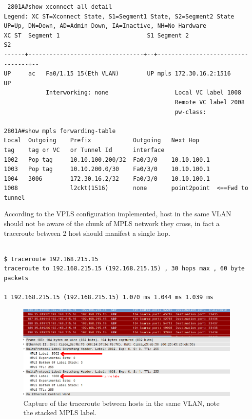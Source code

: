 \documentclass{llncs}
\begin{document}
\lstset{language=sh, caption=Cisco 2801A (LER) configuration after VPLS set-up, basicstyle=\ttfamily\scriptsize , breaklines=true}
\begin{lstlisting}
 2801A#show xconnect all detail 
Legend: XC ST=Xconnect State, S1=Segment1 State, S2=Segment2 State
UP=Up, DN=Down, AD=Admin Down, IA=Inactive, NH=No Hardware
XC ST  Segment 1                         S1 Segment 2                         S2
------+---------------------------------+--+---------------------------------+--
UP     ac   Fa0/1.15 15(Eth VLAN)        UP mpls 172.30.16.2:1516             UP
            Interworking: none                   Local VC label 1008            
                                                 Remote VC label 2008           
                                                 pw-class:          
                                                             
2801A#show mpls forwarding-table 
Local  Outgoing    Prefix            Outgoing   Next Hop    
tag    tag or VC   or Tunnel Id      interface              
1002   Pop tag     10.10.100.200/32  Fa0/3/0    10.10.100.1  
1003   Pop tag     10.10.200.0/30    Fa0/3/0    10.10.100.1  
1004   3006        172.30.16.2/32    Fa0/3/0    10.10.100.1  
1008               l2ckt(1516)       none       point2point  <==Fwd to tunnel
\end{lstlisting}

According to the VPLS configuration implemented, host in the same VLAN should not be aware of the chunk of MPLS network they cross, in fact a traceroute between 2 host should manifest a single hop.\\

\lstset{language=sh, caption=Traceroute from hosts in the same VLAN, basicstyle=\ttfamily\scriptsize , breaklines=true}

\begin{lstlisting}

$ traceroute 192.168.215.15
traceroute to 192.168.215.15 (192.168.215.15) , 30 hops max , 60 byte packets

1 192.168.215.15 (192.168.215.15) 1.070 ms 1.044 ms 1.039 ms
\end{lstlisting}

\begin{figure}
\centering
\includegraphics[width=1.0\textwidth]{../e4/traceroute_vpls.png}
\caption{Capture of the traceroute between hosts in the same VLAN, note the stacked MPLS label.}
\label{fig:mpls2_traceroute_vpls}
\end{figure}
\end{document}
